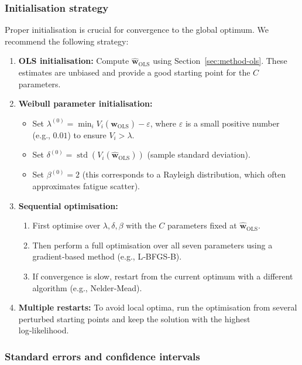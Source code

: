 \subsubsection*{Initialisation strategy}

Proper initialisation is crucial for convergence to the global optimum. We recommend the following strategy:

\begin{enumerate}
    \item \textbf{OLS initialisation:} Compute \(\hat{\mathbf{w}}_{\mathrm{OLS}}\) using Section~\ref{sec:method-ols}. These estimates are unbiased and provide a good starting point for the \(C\) parameters.
    \item \textbf{Weibull parameter initialisation:}
    \begin{itemize}
        \item Set \(\lambda^{(0)} = \min_i V_i(\hat{\mathbf{w}}_{\mathrm{OLS}}) - \varepsilon\), where \(\varepsilon\) is a small positive number (e.g., \(0.01\)) to ensure \(V_i > \lambda\).
        \item Set \(\delta^{(0)} = \operatorname{std}(V_i(\hat{\mathbf{w}}_{\mathrm{OLS}}))\) (sample standard deviation).
        \item Set \(\beta^{(0)} = 2\) (this corresponds to a Rayleigh distribution, which often approximates fatigue scatter).
    \end{itemize}
    \item \textbf{Sequential optimisation:}
    \begin{enumerate}
        \item First optimise over \(\lambda, \delta, \beta\) with the \(C\) parameters fixed at \(\hat{\mathbf{w}}_{\mathrm{OLS}}\).
        \item Then perform a full optimisation over all seven parameters using a gradient‑based method (e.g., L‑BFGS‑B).
        \item If convergence is slow, restart from the current optimum with a different algorithm (e.g., Nelder‑Mead).
    \end{enumerate}
    \item \textbf{Multiple restarts:} To avoid local optima, run the optimisation from several perturbed starting points and keep the solution with the highest log‑likelihood.
\end{enumerate}

\subsubsection*{Standard errors and confidence intervals}

